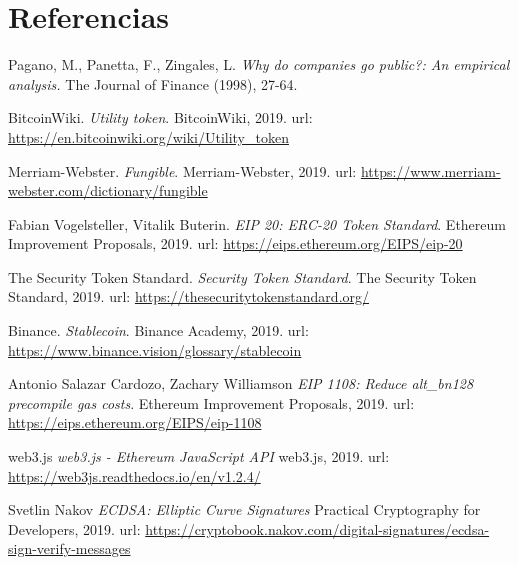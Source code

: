 \section{Referencias}
\begin{thebibliography}{9}
Pagano, M., Panetta, F., Zingales, L. 
\textit{ Why do companies go public?: An empirical
analysis.}
The Journal of Finance (1998), 27-64.

\iffalse
\bibitem{wework} 
Erik Sherman. 
\textit{The Pain From WeWork’s Failed IPO Deepens as Bondholders Get Stuck Underwater}.
Fortunne, 2019.
url: \url{https://fortune.com/2019/11/12/wework-failed-ipo-bonds-underwater/}
 

\bibitem{sec} 
U. S. Securities and Exchange Commission. 
\textit{SEC Proposes to Update Accredited Investor Definition to Increase Access to Investments}.
U. S. Securities and Exchange Commission, 2019.
url: \url{https://www.sec.gov/news/press-release/2019-265}
\fi

BitcoinWiki. 
\textit{Utility token}.
BitcoinWiki, 2019.
url: \url{https://en.bitcoinwiki.org/wiki/Utility_token}

Merriam-Webster. 
\textit{Fungible}.
Merriam-Webster, 2019.
url: \url{https://www.merriam-webster.com/dictionary/fungible}


Fabian Vogelsteller, Vitalik Buterin. 
\textit{EIP 20: ERC-20 Token Standard}.
Ethereum Improvement Proposals, 2019.
url: \url{https://eips.ethereum.org/EIPS/eip-20}

\iffalse
\bibitem{peruvian} 
Pulso. 
\textit{Inversionistas internacionales adquieren el 100\% de Peruvian Airlines}.
LTPulso, 2019.
url: \url{https://www.latercera.com/pulso/noticia/inversionistas-internacionales-adquieren-100-peruvian-airlines/856170/}
\fi

The Security Token Standard. 
\textit{Security Token Standard}.
The Security Token Standard, 2019.
url: \url{https://thesecuritytokenstandard.org/}

Binance. 
\textit{Stablecoin}.
Binance Academy, 2019.
url: \url{https://www.binance.vision/glossary/stablecoin}

Antonio Salazar Cardozo, Zachary Williamson
\textit{EIP 1108: Reduce alt\_bn128 precompile gas costs}.
Ethereum Improvement Proposals, 2019.
url: \url{https://eips.ethereum.org/EIPS/eip-1108}


web3.js
\textit{web3.js - Ethereum JavaScript API}
web3.js, 2019.
url: \url{https://web3js.readthedocs.io/en/v1.2.4/}

Svetlin Nakov
\textit{ECDSA: Elliptic Curve Signatures}
Practical Cryptography for Developers, 2019.
url: \url{https://cryptobook.nakov.com/digital-signatures/ecdsa-sign-verify-messages}
\end{thebibliography}

